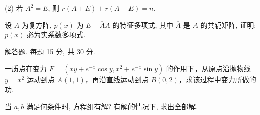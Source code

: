 (2) 若 $A^2 = E$, 则 $r(A + E) + r(A - E) = n$.\par
设 $A$ 为复方阵, $p(x)$ 为 $E - \overline{A} A$ 的特征多项式, 其中 $\overline{A}$ 是 $A$ 的共轭矩阵, 证明: $p(x)$ 必为实系数多项式.\par
\par{}
解答题. 每题 15 分, 共 30 分.\par
一质点在变力 $F = (xy + e^{-x}\cos y, x^2 + e^{-x}\sin y)$ 的作用下，从原点沿抛物线 $y = x^2$ 运动到点 $A(1,1)$，再沿直线运动到点 $B(0,2)$，求该过程中变力所做的功.\par
\par{}
当 $a, b$ 满足何条件时, 方程组有解? 有解的情况下, 求出全部解.\par
\nopagebreak[4]
